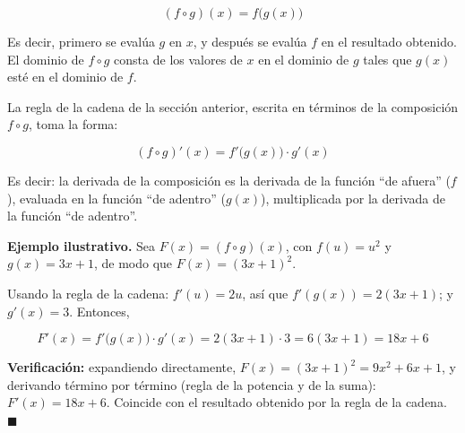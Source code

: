\documentclass[12pt,tikz,border=5pt]{article}
\begin{document}
$$(f\circ g)(x) = f\big(g(x)\big)$$

Es decir, primero se evalúa $g$ en $x$, y después se evalúa $f$ en el
resultado obtenido. El dominio de $f\circ g$ consta de los valores de $x$
en el dominio de $g$ tales que $g(x)$ esté en el dominio de $f$.

\medskip

La regla de la cadena de la sección anterior, escrita en términos de la
composición $f\circ g$, toma la forma:

$$(f\circ g)'(x) = f'\big(g(x)\big)\cdot g'(x)$$

Es decir: la derivada de la composición es la derivada de la función
``de afuera'' ($f$), evaluada en la función ``de adentro'' ($g(x)$),
multiplicada por la derivada de la función ``de adentro''.

\medskip

\textbf{Ejemplo ilustrativo.} Sea $F(x) = (f\circ g)(x)$, con
$f(u)=u^2$ y $g(x)=3x+1$, de modo que $F(x) = (3x+1)^2$.

Usando la regla de la cadena: $f'(u)=2u$, así que $f'(g(x)) = 2(3x+1)$; y
$g'(x)=3$. Entonces,

$$F'(x) = f'\big(g(x)\big)\cdot g'(x) = 2(3x+1)\cdot 3 = 6(3x+1) = 18x+6$$

\textbf{Verificación:} expandiendo directamente, $F(x)=(3x+1)^2 = 9x^2+6x+1$,
y derivando término por término (regla de la potencia y de la suma):
$F'(x) = 18x+6$. Coincide con el resultado obtenido por la regla de la
cadena. $\blacksquare$
\end{document}
